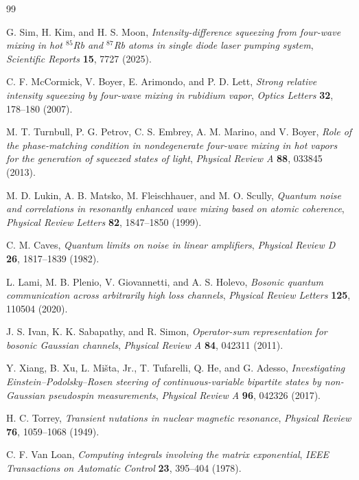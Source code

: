 \documentclass[11pt,a4paper]{article}
\begin{document}
\begin{thebibliography}{99}

G. Sim, H. Kim, and H. S. Moon,
\emph{Intensity-difference squeezing from four-wave mixing in hot
$^{85}$Rb and $^{87}$Rb atoms in single diode laser pumping system},
\emph{Scientific Reports} \textbf{15}, 7727 (2025).

C. F. McCormick, V. Boyer, E. Arimondo, and P. D. Lett,
\emph{Strong relative intensity squeezing by four-wave mixing in rubidium
vapor}, \emph{Optics Letters} \textbf{32}, 178--180 (2007).

M. T. Turnbull, P. G. Petrov, C. S. Embrey, A. M. Marino, and V. Boyer,
\emph{Role of the phase-matching condition in nondegenerate four-wave mixing
in hot vapors for the generation of squeezed states of light},
\emph{Physical Review A} \textbf{88}, 033845 (2013).

M. D. Lukin, A. B. Matsko, M. Fleischhauer, and M. O. Scully,
\emph{Quantum noise and correlations in resonantly enhanced wave mixing
based on atomic coherence}, \emph{Physical Review Letters} \textbf{82},
1847--1850 (1999).

C. M. Caves,
\emph{Quantum limits on noise in linear amplifiers},
\emph{Physical Review D} \textbf{26}, 1817--1839 (1982).

L. Lami, M. B. Plenio, V. Giovannetti, and A. S. Holevo,
\emph{Bosonic quantum communication across arbitrarily high loss channels},
\emph{Physical Review Letters} \textbf{125}, 110504 (2020).

J. S. Ivan, K. K. Sabapathy, and R. Simon,
\emph{Operator-sum representation for bosonic Gaussian channels},
\emph{Physical Review A} \textbf{84}, 042311 (2011).

Y. Xiang, B. Xu, L. Mi\v{s}ta, Jr., T. Tufarelli, Q. He, and G. Adesso,
\emph{Investigating Einstein--Podolsky--Rosen steering of continuous-variable
bipartite states by non-Gaussian pseudospin measurements},
\emph{Physical Review A} \textbf{96}, 042326 (2017).

H. C. Torrey,
\emph{Transient nutations in nuclear magnetic resonance},
\emph{Physical Review} \textbf{76}, 1059--1068 (1949).

C. F. Van Loan,
\emph{Computing integrals involving the matrix exponential},
\emph{IEEE Transactions on Automatic Control} \textbf{23}, 395--404 (1978).


\end{thebibliography}
\end{document}

